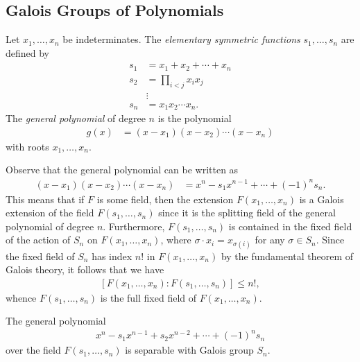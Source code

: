 \documentclass[10pt]{mypackage}
\begin{document}
\subsection{Galois Groups of Polynomials}%
\begin{definition}
  Let $x_1,\dots,x_n$ be indeterminates. The \textit{elementary symmetric functions} $s_1,\dots,s_n$ are defined by
  \begin{align*}
    s_1 &= x_1 + x_2 + \cdots + x_n\\
    s_2 &= \prod_{i < j}x_ix_j\\
        &\vdots\\
    s_n &= x_1x_2\cdots x_n.
  \end{align*}
  The \textit{general polynomial} of degree $n$ is the polynomial
  \begin{align*}
    g(x) &= \left( x-x_1 \right)\left( x-x_2 \right)\cdots \left( x-x_n \right)
  \end{align*}
  with roots $x_1,\dots,x_n$.
\end{definition}
Observe that the general polynomial can be written as
\begin{align*}
  \left( x-x_1 \right)\left( x-x_2 \right)\cdots \left( x-x_n \right) &= x^{n} -s_1x^{n-1} + \cdots + \left( -1 \right)^{n}s_n.
\end{align*}
This means that if $F$ is some field, then the extension $F\left( x_1,\dots,x_n \right)$ is a Galois extension of the field $F\left( s_1,\dots,s_n \right)$ since it is the splitting field of the general polynomial of degree $n$. Furthermore, $F\left( s_1,\dots,s_n \right)$ is contained in the fixed field of the action of $S_n$ on $F\left( x_1,\dots,x_n \right)$, where $\sigma\cdot x_i = x_{\sigma(i)}$ for any $\sigma\in S_n$. Since the fixed field of $S_n$ has index $n!$ in $F\left( x_1,\dots,x_n \right)$ by the fundamental theorem of Galois theory, it follows that we have
\begin{align*}
  \left[ F\left( x_1,\dots,x_n \right):F\left( s_1,\dots,s_n \right) \right]\leq n!,
\end{align*}
whence $F\left( s_1,\dots,s_n \right)$ is the full fixed field of $F\left( x_1,\dots,x_n \right)$.
\begin{theorem}
  The general polynomial
  \begin{align*}
    x^{n} -s_1x^{n-1} + s_2x^{n-2} + \cdots + \left( -1 \right)^{n}s_n
  \end{align*}
  over the field $F\left( s_1,\dots,s_n \right)$ is separable with Galois group $S_n$.
\end{theorem}
\end{document}
